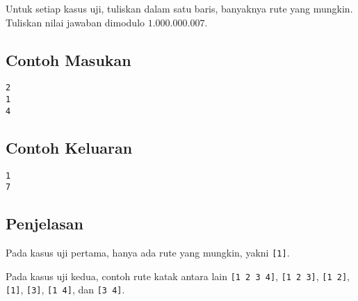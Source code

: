 \documentclass{article}
\begin{document}
Untuk setiap kasus uji, tuliskan dalam satu baris, banyaknya rute yang mungkin. Tuliskan nilai jawaban dimodulo $1.000.000.007$.

\begin{multicols}{2}
\subsection*{Contoh Masukan}
\begin{lstlisting}
2
1
4
\end{lstlisting}
\columnbreak
\subsection*{Contoh Keluaran}
\begin{lstlisting}
1
7
\end{lstlisting}
\vfill
\null
\end{multicols}

\subsection*{Penjelasan}

Pada kasus uji pertama, hanya ada rute yang mungkin, yakni \lstinline{[1]}.

Pada kasus uji kedua, contoh rute katak antara lain \lstinline{[1 2 3 4]}, \lstinline{[1 2 3]}, \lstinline{[1 2]}, \lstinline{[1]}, \lstinline{[3]}, \lstinline{[1 4]}, dan \lstinline{[3 4]}.

\pagebreak
\end{document}
